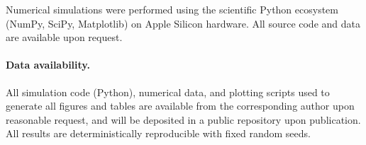 \documentclass[prx,twocolumn,superscriptaddress,longbibliography,floatfix]{revtex4-2}
\begin{document}
\begin{acknowledgments}
Numerical simulations were performed using the scientific Python ecosystem (NumPy, SciPy, Matplotlib) on Apple Silicon hardware.
All source code and data are available upon request.
\end{acknowledgments}

\paragraph*{Data availability.}
All simulation code (Python), numerical data, and plotting scripts used to generate all figures and tables are available from the corresponding author upon reasonable request, and will be deposited in a public repository upon publication.
All results are deterministically reproducible with fixed random seeds. 

  
  
   


\end{document}
